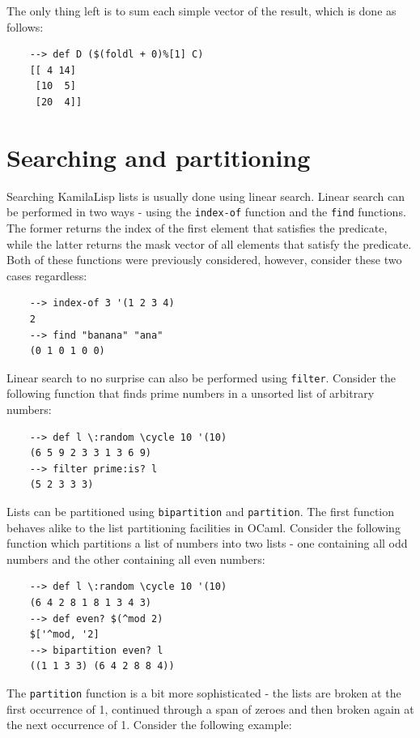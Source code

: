 The only thing left is to sum each simple vector of the result, which is done as follows:

\begin{Verbatim}
    --> def D ($(foldl + 0)%[1] C)
    [[ 4 14]
     [10  5]
     [20  4]]
\end{Verbatim}

\section{Searching and partitioning}

Searching KamilaLisp lists is usually done using linear search. Linear search can be performed in two ways - using the \verb|index-of| function and the \verb|find| functions. The former returns the index of the first element that satisfies the predicate, while the latter returns the mask vector of all elements that satisfy the predicate. Both of these functions were previously considered, however, consider these two cases regardless:

\begin{Verbatim}
    --> index-of 3 '(1 2 3 4)
    2
    --> find "banana" "ana"
    (0 1 0 1 0 0)
\end{Verbatim}

Linear search to no surprise can also be performed using \verb|filter|. Consider the following function that finds prime numbers in a unsorted list of arbitrary numbers:

\begin{Verbatim}
    --> def l \:random \cycle 10 '(10)
    (6 5 9 2 3 3 1 3 6 9)
    --> filter prime:is? l
    (5 2 3 3 3)
\end{Verbatim}

Lists can be partitioned using \verb|bipartition| and \verb|partition|. The first function behaves alike to the list partitioning facilities in OCaml. Consider the following function which partitions a list of numbers into two lists - one containing all odd numbers and the other containing all even numbers:

\begin{Verbatim}
    --> def l \:random \cycle 10 '(10)
    (6 4 2 8 1 8 1 3 4 3)
    --> def even? $(^mod 2)
    $['^mod, '2]
    --> bipartition even? l
    ((1 1 3 3) (6 4 2 8 8 4))
\end{Verbatim}

The \verb|partition| function is a bit more sophisticated - the lists are broken at the first occurrence of 1, continued through a span of zeroes and then broken again at the next occurrence of 1. Consider the following example:

